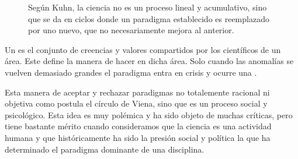 \begin{figure}[ht]
    \centering


    \caption{Según Kuhn, la ciencia no es un proceso lineal y acumulativo, sino
        que se da en ciclos donde un paradigma establecido es reemplazado por
        uno nuevo, que no necesariamente mejora al anterior.}
\end{figure}

\begin{remember}
    \label{rem:paradigma}
    Un  es el conjunto de creencias y valores compartidos
    por los científicos de un área.
    Este define la manera de hacer  en dicha área.
    Solo cuando las anomalías se vuelven demasiado grandes el paradigma entra
    en crisis y ocurre una .
\end{remember}

Esta manera de aceptar y rechazar paradigmas no totalemente racional ni objetiva
como postula el círculo de Viena, sino que es un proceso social y psicológico.
Esta idea es muy polémica y ha sido objeto de muchas críticas, pero tiene
bastante mérito cuando consideramos que la ciencia es una actividad humana y que
históricamente ha sido la presión social y política la que ha determinado el
paradigma dominante de una disciplina.


